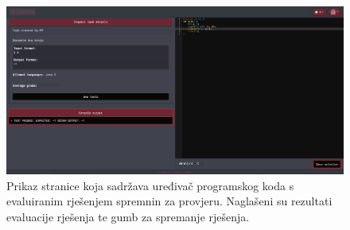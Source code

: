 \documentclass[times, utf8, zavrsni]{fer}
\begin{document}
		\begin{figure}[htb]
			\centering
			\includegraphics[width=\linewidth]{pictures/koristenje/RijeseniZadatak.png}
			\caption{Prikaz stranice koja sadržava uređivač programskog koda s evaluiranim rješenjem spremnin za provjeru. Naglašeni su rezultati evaluacije rješenja te gumb za spremanje rješenja.}
			\label{fig:rjeseno}
		\end{figure}
	
\end{document}
